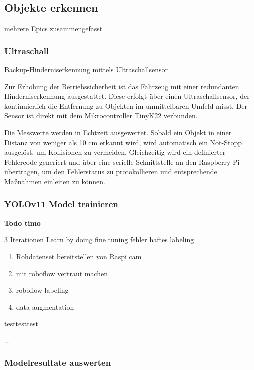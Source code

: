 
\subsection{Objekte erkennen}

mehrere Epics zusammengefasst 

\subsubsection{Ultraschall}
\label{ultraschall}

Backup-Hinderniserkennung mittels Ultraschallsensor

Zur Erhöhung der Betriebssicherheit ist das Fahrzeug mit einer redundanten Hinderniserkennung ausgestattet. Diese erfolgt über einen Ultraschallsensor, der kontinuierlich die Entfernung zu Objekten im unmittelbaren Umfeld misst. Der Sensor ist direkt mit dem Mikrocontroller TinyK22 verbunden.

Die Messwerte werden in Echtzeit ausgewertet. Sobald ein Objekt in einer Distanz von weniger als 10 cm erkannt wird, wird automatisch ein Not-Stopp ausgelöst, um Kollisionen zu vermeiden. Gleichzeitig wird ein definierter Fehlercode generiert und über eine serielle Schnittstelle an den Raspberry Pi übertragen, um den Fehlerstatus zu protokollieren und entsprechende Maßnahmen einleiten zu können.


\subsubsection{YOLOv11 Model trainieren}
\textbf{Todo timo}

3 Iterationen
Learn by doing
fine tuning
fehler haftes labeling
\begin{enumerate}
    \item Rohdatenset bereitstellen von Raspi cam
    \item mit roboflow vertraut machen
    \item roboflow labeling
    \item data augmentation
\end{enumerate}
testtesttest

...

\subsubsection{Modelresultate auswerten}
\label{model-results}

